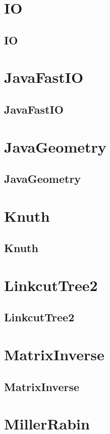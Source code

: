 \documentclass[a4paper, twocolumn]{article}
\begin{document}
\section{IO}
\subsection{IO}

\section{JavaFastIO}
\subsection{JavaFastIO}

\section{JavaGeometry}
\subsection{JavaGeometry}

\section{Knuth}
\subsection{Knuth}

\section{LinkcutTree2}
\subsection{LinkcutTree2}

\section{MatrixInverse}
\subsection{MatrixInverse}

\section{MillerRabin}
\end{document}
